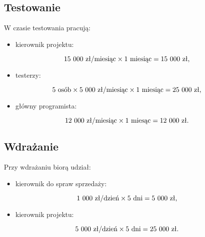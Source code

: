 \documentclass [11pt, a4paper, leqno] {article}
\begin{document}
\subsection{Testowanie}
\noindent
W czasie testowania pracują:

\begin{itemize}
\item kierownik projektu: 
\end{itemize}
\begin{equation} 15\\\ 000 \text{ zł/miesiąc} \times 1 \text{ miesiąc} = 15\\\ 000 \text{ zł,} \end{equation}

\begin{itemize}
\item testerzy: 
\end{itemize}
\begin{equation}5 \text{ osób} \times 5\\\ 000 \text{ zł/miesiąc} \times 1 \text{ miesiąc} = 25\\\ 000 \text{ zł,} \end{equation}

\begin{itemize}
\item główny programista: 
\end{itemize}
\begin{equation}12\\\ 000 \text{ zł/miesiąc} \times 1 \text{ miesąc} = 12\\\ 000 \text{ zł.} \end{equation}

\subsection{Wdrażanie}
\noindent
Przy wdrażaniu biorą udział:

\begin{itemize}
\item kierownik do spraw sprzedaży: 
\end{itemize}
\begin{equation}1\\\ 000 \text{ zł/dzień} \times 5 \text{ dni} = 5\\\ 000 \text{ zł,} \end{equation}

\begin{itemize}
\item kierownik projektu: 
\end{itemize}
\begin{equation}5\\\ 000 \text{ zł/dzień} \times 5 \text{ dni} = 25\\\ 000 \text{ zł.} \end{equation}
\end{document}
